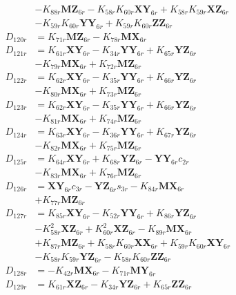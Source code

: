 \begin{multicols}{2}
\begin{align}
&- K_{88r}\mathbf{MZ}_{6r} - K_{58r}K_{60r}\mathbf{XY}_{6r} + K_{58r}K_{59r}\mathbf{XZ}_{6r}  \nonumber \\
&- K_{59r}K_{60r}\mathbf{YY}_{6r} + K_{59r}K_{60r}\mathbf{ZZ}_{6r} \nonumber \\
D_{120r} &= K_{71r}\mathbf{MZ}_{6r} - K_{78r}\mathbf{MX}_{6r} \nonumber \\
D_{121r} &= K_{61r}\mathbf{XY}_{6r} - K_{34r}\mathbf{YY}_{6r} + K_{65r}\mathbf{YZ}_{6r}  \nonumber \\
&- K_{79r}\mathbf{MX}_{6r} + K_{72r}\mathbf{MZ}_{6r} \nonumber \\
D_{122r} &= K_{62r}\mathbf{XY}_{6r} - K_{35r}\mathbf{YY}_{6r} + K_{66r}\mathbf{YZ}_{6r}  \nonumber \\
&- K_{80r}\mathbf{MX}_{6r} + K_{73r}\mathbf{MZ}_{6r} \nonumber \\
D_{123r} &= K_{62r}\mathbf{XY}_{6r} - K_{35r}\mathbf{YY}_{6r} + K_{66r}\mathbf{YZ}_{6r}  \nonumber \\
&- K_{81r}\mathbf{MX}_{6r} + K_{74r}\mathbf{MZ}_{6r} \nonumber \\
D_{124r} &= K_{63r}\mathbf{XY}_{6r} - K_{36r}\mathbf{YY}_{6r} + K_{67r}\mathbf{YZ}_{6r}  \nonumber \\
&- K_{82r}\mathbf{MX}_{6r} + K_{75r}\mathbf{MZ}_{6r} \nonumber \\
D_{125r} &= K_{64r}\mathbf{XY}_{6r} + K_{68r}\mathbf{YZ}_{6r} - \mathbf{YY}_{6r}c_{2r}  \nonumber \\
&- K_{83r}\mathbf{MX}_{6r} + K_{76r}\mathbf{MZ}_{6r} \nonumber \\
D_{126r} &= \mathbf{XY}_{6r}c_{3r} - \mathbf{YZ}_{6r}s_{3r} - K_{84r}\mathbf{MX}_{6r}  \nonumber \\
&+ K_{77r}\mathbf{MZ}_{6r} \nonumber \\
D_{127r} &= K_{85r}\mathbf{XY}_{6r} - K_{52r}\mathbf{YY}_{6r} + K_{86r}\mathbf{YZ}_{6r}  \nonumber \\
&- K_{58r}^2\mathbf{XZ}_{6r} + K_{60r}^2\mathbf{XZ}_{6r} - K_{89r}\mathbf{MX}_{6r}  \nonumber \\
&+ K_{87r}\mathbf{MZ}_{6r} + K_{58r}K_{60r}\mathbf{XX}_{6r} + K_{59r}K_{60r}\mathbf{XY}_{6r}  \nonumber \\
&- K_{58r}K_{59r}\mathbf{YZ}_{6r} - K_{58r}K_{60r}\mathbf{ZZ}_{6r} \nonumber \\
D_{128r} &= - K_{42r}\mathbf{MX}_{6r} - K_{71r}\mathbf{MY}_{6r} \nonumber \\
D_{129r} &= K_{61r}\mathbf{XZ}_{6r} - K_{34r}\mathbf{YZ}_{6r} + K_{65r}\mathbf{ZZ}_{6r}  \nonumber \\

\end{align}
\end{multicols}

